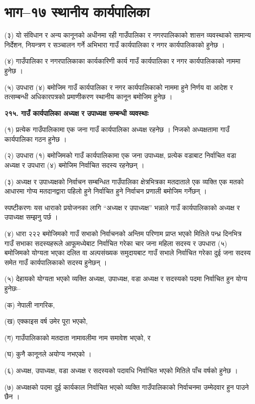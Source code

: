 \section{भाग–१७ स्थानीय कार्यपालिका}

(३) यो संविधान र अन्य कानूनको अधीनमा रही गाउँपालिका र नगरपालिकाको शासन व्यवस्थाको सामान्य निर्देशन, नियन्त्रण र सञ्चालन गर्ने अभिभारा गाउँ कार्यपालिका र नगर कार्यपालिकाको हुनेछ ।

(४) गाउँपालिका र नगरपालिकाका कार्यकारिणी कार्य गाउँ कार्यपालिका र नगर कार्यपालिकाको नाममा हुनेछ ।

(५) उपधारा (४) बमोजिम गाउँ कार्यपालिका र नगर कार्यपालिकाको नाममा हुने निर्णय वा आदेश र तत्सम्बन्धी अधिकारपत्रको प्रमाणीकरण स्थानीय कानून बमोजिम हुनेछ ।

\textbf{२१५. गाउँ कार्यपालिका अध्यक्ष र उपाध्यक्ष सम्बन्धी व्यवस्थाः}

(१) प्रत्येक गाउँपालिकामा एक जना गाउँ कार्यपालिका अध्यक्ष रहनेछ । निजको अध्यक्षतामा गाउँ कार्यपालिका गठन हुनेछ ।

(२) उपधारा (१) बमोजिमको गाउँ कार्यपालिकामा एक जना उपाध्यक्ष, प्रत्येक वडाबाट निर्वाचित वडा अध्यक्ष र उपधारा (४) बमोजिम
निर्वाचित सदस्य रहनेछन् ।

(३) अध्यक्ष र उपाध्यक्षको निर्वाचन सम्बन्धित गाउँपालिका क्षेत्रभित्रका मतदाताले एक व्यक्ति एक मतको आधारमा गोप्य मतदानद्वारा पहिलो हुने निर्वाचित हुने निर्वाचन प्रणाली बमोजिम गर्नेछन् ।

स्पष्टीकरणः यस धाराको प्रयोजनका लागि “अध्यक्ष र उपाध्यक्ष” भन्नाले गाउँ कार्यपालिकाको अध्यक्ष र उपाध्यक्ष सम्झनु पर्छ ।

(४) धारा २२२ बमोजिमको गाउँ सभाको निर्वाचनको अन्तिम परिणाम प्राप्त भएको मितिले पन्ध्र दिनभित्र गाउँ सभाका सदस्यहरूले आफूमध्येबाट निर्वाचित गरेका चार जना महिला सदस्य र उपधारा (५) बमोजिमको योग्यता भएका दलित वा अल्पसंख्यक समुदायबाट गाउँ सभाले निर्वाचित गरेका दुई जना सदस्य समेत गाउँ कार्यपालिकाको सदस्य हुनेछन् ।

(५) देहायको योग्यता भएको व्यक्ति अध्यक्ष, उपाध्यक्ष, वडा अध्यक्ष र सदस्यको पदमा निर्वाचित हुन योग्य हुनेछः–

(क) नेपाली नागरिक,

(ख) एक्काइस वर्ष उमेर पूरा भएको,

(ग) गाउँपालिकाको मतदाता नामावलीमा नाम समावेश भएको, र

(घ) कुनै कानूनले अयोग्य नभएको ।

(६) अध्यक्ष, उपाध्यक्ष, वडा अध्यक्ष र सदस्यको पदावधि निर्वाचित भएको मितिले पाँच वर्षको हुनेछ ।

(७) अध्यक्षको पदमा दुई कार्यकाल निर्वाचित भएको व्यक्ति गाउँपालिकाको निर्वाचनमा उम्मेदवार हुन पाउने छैन ।

